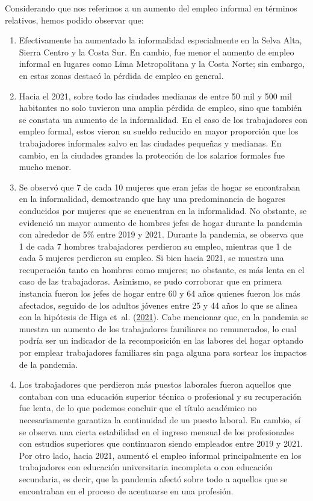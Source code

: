 \documentclass[
  letterpaper,
  12pt,
  oneside,
  spanish,
  doublespacing,
  headsepline,
  parskip]{MastersDoctoralThesis}
\begin{document}
Considerando que nos referimos a un aumento del empleo informal en
términos relativos, hemos podido observar que:

\begin{enumerate}
\def\labelenumi{\Alph{enumi})}
\item
  Efectivamente ha aumentado la informalidad especialmente en la Selva
  Alta, Sierra Centro y la Costa Sur. En cambio, fue menor el aumento de
  empleo informal en lugares como Lima Metropolitana y la Costa Norte;
  sin embargo, en estas zonas destacó la pérdida de empleo en general.
\item
  Hacia el 2021, sobre todo las ciudades medianas de entre 50 mil y 500
  mil habitantes no solo tuvieron una amplia pérdida de empleo, sino que
  también se constata un aumento de la informalidad. En el caso de los
  trabajadores con empleo formal, estos vieron su sueldo reducido en
  mayor proporción que los trabajadores informales salvo en las ciudades
  pequeñas y medianas. En cambio, en la ciudades grandes la protección
  de los salarios formales fue mucho menor.
\item
  Se observó que 7 de cada 10 mujeres que eran jefas de hogar se
  encontraban en la informalidad, demostrando que hay una predominancia
  de hogares conducidos por mujeres que se encuentran en la
  informalidad. No obstante, se evidenció un mayor aumento de hombres
  jefes de hogar durante la pandemia con alrededor de 5\% entre 2019 y
  2021. Durante la pandemia, se observa que 1 de cada 7 hombres
  trabajadores perdieron su empleo, mientras que 1 de cada 5 mujeres
  perdieron su empleo. Si bien hacia 2021, se muestra una recuperación
  tanto en hombres como mujeres; no obstante, es más lenta en el caso de
  las trabajadoras. Asimismo, se pudo corroborar que en primera
  instancia fueron los jefes de hogar entre 60 y 64 años quienes fueron
  los más afectados, seguido de los adultos jóvenes entre 25 y 44 años
  lo que se alinea con la hipótesis de Higa et~al.
  (\protect\hyperlink{ref-higa2021}{2021}). Cabe mencionar que, en la
  pandemia se muestra un aumento de los trabajadores familiares no
  remunerados, lo cual podría ser un indicador de la recomposición en
  las labores del hogar optando por emplear trabajadores familiares sin
  paga alguna para sortear los impactos de la pandemia.
\item
  Los trabajadores que perdieron más puestos laborales fueron aquellos
  que contaban con una educación superior técnica o profesional y su
  recuperación fue lenta, de lo que podemos concluir que el título
  académico no necesariamente garantiza la continuidad de un puesto
  laboral. En cambio, sí se observa una cierta estabilidad en el ingreso
  mensual de los profesionales con estudios superiores que continuaron
  siendo empleados entre 2019 y 2021. Por otro lado, hacia 2021, aumentó
  el empleo informal principalmente en los trabajadores con educación
  universitaria incompleta o con educación secundaria, es decir, que la
  pandemia afectó sobre todo a aquellos que se encontraban en el proceso
  de acentuarse en una profesión.
\end{enumerate}
\end{document}
